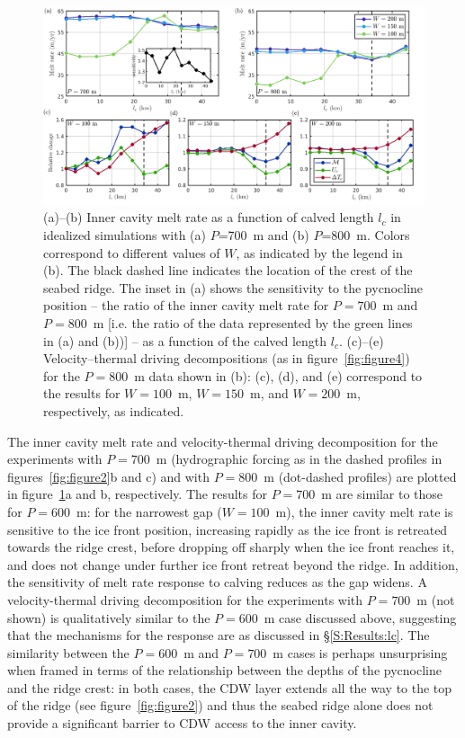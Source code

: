 \documentclass[draft]{agujournal2019}
\begin{document}
\begin{figure}
    \centering
    \includegraphics[width = \textwidth]{../make_figures/plots/figure8.png}
    \caption{(a)--(b) Inner cavity melt rate as a function of calved length $l_c$ in idealized simulations with (a) $P$=700~m and (b) $P$=800~m. Colors correspond to different values of $W$, as indicated by the legend in (b). The black dashed line indicates the location of the crest of the seabed ridge. The inset in (a) shows the sensitivity to the pycnocline position -- the ratio of the inner cavity melt rate for $P = 700$~m and $P = 800$~m [i.e. the ratio of the data represented by the green lines in (a) and (b))] -- as a function of the calved length $l_c$. (c)--(e) Velocity--thermal driving decompositions (as in figure~\ref{fig:figure4}) for the $P = 800$~m data shown in (b): (c), (d), and (e) correspond to the results for $W=100$~m, $W=150$~m, and $W=200$~m, respectively, as indicated.}
    \label{fig:figure8}
\end{figure}


The inner cavity melt rate and velocity-thermal driving decomposition for the experiments with $P=700$~m (hydrographic forcing as in the dashed profiles in figures~\ref{fig:figure2}b and c) and with $P=800$~m (dot-dashed profiles) are plotted in figure~\ref{fig:figure8}a and b, respectively. The results for $P=700$~m are similar to those for $P=600$~m: for the narrowest gap ($W=100$~m), the inner cavity melt rate is sensitive to the ice front position, increasing rapidly as the ice front is retreated towards the ridge crest, before dropping off sharply when the ice front reaches it, and does not change under further ice front retreat beyond the ridge. In addition, the sensitivity of melt rate response to calving reduces as the gap widens. A velocity-thermal driving decomposition for the experiments with $P=700$~m (not shown) is qualitatively similar to the $P=600$~m case discussed above, suggesting that the mechanisms for the response are as discussed in \S\ref{S:Results:lc}. The similarity between the $P=600$~m and $P=700$~m cases is perhaps unsurprising when framed in terms of the relationship between the depths of the pycnocline and the ridge crest: in both cases, the CDW layer extends all the way to the top of the ridge (see figure~\ref{fig:figure2}) and thus the seabed ridge alone does not provide a significant barrier to CDW access to the inner cavity.
\end{document}

